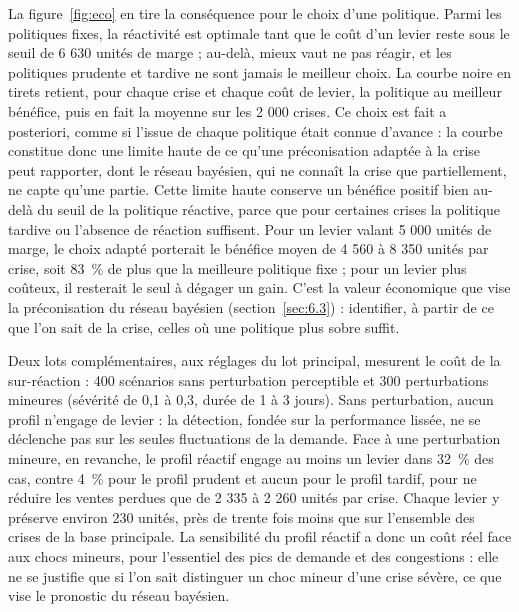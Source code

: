 La figure~\ref{fig:eco} en tire la conséquence pour le choix d'une politique. Parmi les politiques fixes, la réactivité est optimale tant que le coût d'un levier reste sous le seuil de 6 630 unités de marge ; au-delà, mieux vaut ne pas réagir, et les politiques prudente et tardive ne sont jamais le meilleur choix. La courbe noire en tirets retient, pour chaque crise et chaque coût de levier, la politique au meilleur bénéfice, puis en fait la moyenne sur les 2 000 crises. Ce choix est fait a posteriori, comme si l'issue de chaque politique était connue d'avance : la courbe constitue donc une limite haute de ce qu'une préconisation adaptée à la crise peut rapporter, dont le réseau bayésien, qui ne connaît la crise que partiellement, ne capte qu'une partie. Cette limite haute conserve un bénéfice positif bien au-delà du seuil de la politique réactive, parce que pour certaines crises la politique tardive ou l'absence de réaction suffisent. Pour un levier valant 5 000 unités de marge, le choix adapté porterait le bénéfice moyen de 4 560 à 8 350 unités par crise, soit 83~\% de plus que la meilleure politique fixe ; pour un levier plus coûteux, il resterait le seul à dégager un gain. C'est la valeur économique que vise la préconisation du réseau bayésien (section~\ref{sec:6.3}) : identifier, à partir de ce que l'on sait de la crise, celles où une politique plus sobre suffit.

Deux lots complémentaires, aux réglages du lot principal, mesurent le coût de la sur-réaction : 400 scénarios sans perturbation perceptible et 300 perturbations mineures (sévérité de 0,1 à 0,3, durée de 1 à 3 jours). Sans perturbation, aucun profil n'engage de levier : la détection, fondée sur la performance lissée, ne se déclenche pas sur les seules fluctuations de la demande. Face à une perturbation mineure, en revanche, le profil réactif engage au moins un levier dans 32~\% des cas, contre 4~\% pour le profil prudent et aucun pour le profil tardif, pour ne réduire les ventes perdues que de 2 335 à 2 260 unités par crise. Chaque levier y préserve environ 230 unités, près de trente fois moins que sur l'ensemble des crises de la base principale. La sensibilité du profil réactif a donc un coût réel face aux chocs mineurs, pour l'essentiel des pics de demande et des congestions : elle ne se justifie que si l'on sait distinguer un choc mineur d'une crise sévère, ce que vise le pronostic du réseau bayésien.
